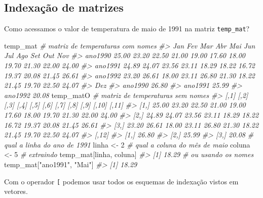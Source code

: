 \documentclass[]{book}
\newenvironment{Shaded}{\begin{snugshade}}{\end{snugshade}}
\newcommand{\DecValTok}[1]{\textcolor[rgb]{0.00,0.00,0.81}{#1}}
\newcommand{\StringTok}[1]{\textcolor[rgb]{0.31,0.60,0.02}{#1}}
\newcommand{\CommentTok}[1]{\textcolor[rgb]{0.56,0.35,0.01}{\textit{#1}}}
\newcommand{\NormalTok}[1]{#1}
\begin{document}
\subsection{Indexação de matrizes}\label{indexacao-de-matrizes}

Como acessamos o valor de temperatura de maio de 1991 na matriz
\texttt{temp\_mat}?

\begin{Shaded}
\begin{Highlighting}[]
\NormalTok{temp_mat  }\CommentTok{# matriz de temperaturas com nomes}
\CommentTok{#>           Jan   Fev   Mar   Abr   Mai   Jun   Jul   Ago   Set   Out   Nov}
\CommentTok{#> ano1990 25.00 23.20 22.50 21.00 19.00 17.60 18.00 19.70 21.30 22.00 24.00}
\CommentTok{#> ano1991 24.89 24.07 23.56 23.11 18.29 18.22 16.72 19.37 20.08 21.45 26.61}
\CommentTok{#> ano1992 23.20 26.61 18.00 23.11 26.80 21.30 18.22 21.45 19.70 22.50 24.07}
\CommentTok{#>           Dez}
\CommentTok{#> ano1990 26.80}
\CommentTok{#> ano1991 25.99}
\CommentTok{#> ano1992 20.08}
\NormalTok{temp_matO  }\CommentTok{# matriz de temperaturas sem nomes}
\CommentTok{#>       [,1]  [,2]  [,3]  [,4]  [,5]  [,6]  [,7]  [,8]  [,9] [,10] [,11]}
\CommentTok{#> [1,] 25.00 23.20 22.50 21.00 19.00 17.60 18.00 19.70 21.30 22.00 24.00}
\CommentTok{#> [2,] 24.89 24.07 23.56 23.11 18.29 18.22 16.72 19.37 20.08 21.45 26.61}
\CommentTok{#> [3,] 23.20 26.61 18.00 23.11 26.80 21.30 18.22 21.45 19.70 22.50 24.07}
\CommentTok{#>      [,12]}
\CommentTok{#> [1,] 26.80}
\CommentTok{#> [2,] 25.99}
\CommentTok{#> [3,] 20.08}
\CommentTok{# qual a linha do ano de 1991}
\NormalTok{linha <-}\StringTok{ }\DecValTok{2}
\CommentTok{# qual a coluna do mês de maio}
\NormalTok{coluna <-}\StringTok{ }\DecValTok{5}
\CommentTok{# extraindo}
\NormalTok{temp_mat[linha, coluna]}
\CommentTok{#> [1] 18.29}
\CommentTok{# ou usando os nomes}
\NormalTok{temp_mat[}\StringTok{"ano1991"}\NormalTok{, }\StringTok{"Mai"}\NormalTok{]}
\CommentTok{#> [1] 18.29}
\end{Highlighting}
\end{Shaded}

Com o operador \texttt{{[}} podemos usar todos os esquemas de indexação
vistos em vetores.
\end{document}
